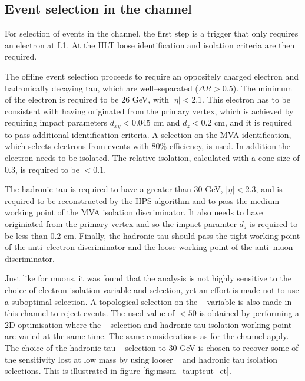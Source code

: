 \subsection{\texorpdfstring{Event selection in the \etau channel}{Event selection in the e tau channel}}
\label{sec:mssm_eventsel_et}
For selection of events in the \etau channel, the first step is
a trigger that only requires an electron at \ac{L1}. At the \ac{HLT}
loose identification and isolation criteria are then required.

The offline event selection proceeds to require an oppositely charged
electron and hadronically decaying tau, which are well--separated ($\Delta R > 0.5$).
The minimum \pT of the electron is required to be 26 GeV, with $|\eta| < 2.1$. %
This electron has to be consistent with having originated from the primary vertex, which
is achieved by requiring impact parameters $d_{xy} < 0.045$ cm and $d_{z} < 0.2$ cm, and it
is required to pass additional identification criteria. A selection on the MVA identification, which
selects electrons from \Zee events with 80\% efficiency, is used. In addition the
electron needs to be isolated. The relative isolation, calculated with a cone size of 0.3, is required to be $< 0.1$.

The hadronic tau is required to have a \pT greater than 30 GeV, $|\eta|<2.3$,
and is required to be reconstructed by the HPS algorithm and to pass the medium
working point of the MVA isolation discriminator. It also needs
to have originiated from the primary vertex and so the impact paramter $d_{z}$ is 
required to be less than 0.2 cm. Finally, the hadronic tau should
pass the tight working point of the anti--electron discriminator
and the loose working point of the anti--muon discriminator.

Just like for muons, it was found that the analysis is not highly sensitive
to the choice of electron isolation variable and selection, yet an effort
is made not to use a suboptimal selection.
A topological selection on the \mT~ variable is also made in this channel to reject \Wjets events. 
The used value of \mT $< 50$ is obtained by performing a 2D optimisation where the \mT~ selection
and hadronic tau isolation working point are varied at the same time. The same considerations as
for the \mutau channel apply. The choice of the hadronic tau \pT~ selection to 30 GeV is
chosen to recover some of the sensitivity lost at low mass by using looser \mT~ and hadronic
tau isolation selections. This is illustrated in figure \ref{fig:mssm_tauptcut_et}.

